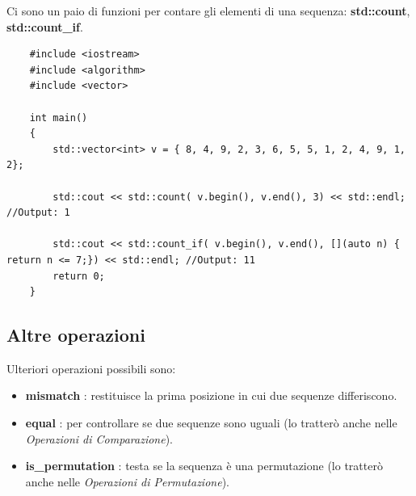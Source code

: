 \textsf{\small Ci sono un paio di funzioni per contare gli elementi di una sequenza: \textbf{std::count}, \textbf{std::count\_if}.} \\

\begin{lstlisting}
	#include <iostream>
	#include <algorithm>
	#include <vector>
	
	int main()
	{
		std::vector<int> v = { 8, 4, 9, 2, 3, 6, 5, 5, 1, 2, 4, 9, 1, 2};
		
		std::cout << std::count( v.begin(), v.end(), 3) << std::endl; //Output: 1
		
		std::cout << std::count_if( v.begin(), v.end(), [](auto n) { return n <= 7;}) << std::endl; //Output: 11
		return 0;
	}
\end{lstlisting}

\subsection{Altre operazioni}

\textsf{\small Ulteriori operazioni possibili sono: } \\

\begin{itemize}
	\item \textsf{\small \textbf{mismatch} : restituisce la prima posizione in cui due sequenze differiscono.}
	\item \textsf{\small \textbf{equal} : per controllare se due sequenze sono uguali (lo tratterò anche nelle \emph{Operazioni di Comparazione}).}
	\item \textsf{\small \textbf{is\_permutation} : testa se la sequenza è una permutazione (lo tratterò anche nelle \emph{Operazioni di Permutazione}).}
\end{itemize}

